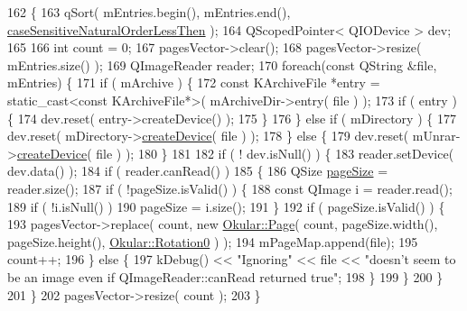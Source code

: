 \begin{DoxyCode}
162 \{
163     qSort( mEntries.begin(), mEntries.end(), \hyperlink{qnatsort_8cpp_a47cfb218123c3ff38d8e674fb78b9f0d}{caseSensitiveNaturalOrderLessThen}
       );
164     QScopedPointer< QIODevice > dev;
165 
166     \textcolor{keywordtype}{int} count = 0;
167     pagesVector->clear();
168     pagesVector->resize( mEntries.size() );
169     QImageReader reader;
170     \textcolor{keywordflow}{foreach}(\textcolor{keyword}{const} QString &file, mEntries) \{
171         \textcolor{keywordflow}{if} ( mArchive ) \{
172             \textcolor{keyword}{const} KArchiveFile *entry = \textcolor{keyword}{static\_cast<}\textcolor{keyword}{const }KArchiveFile*\textcolor{keyword}{>}( mArchiveDir->entry( file ) );
173             \textcolor{keywordflow}{if} ( entry ) \{
174                 dev.reset( entry->createDevice() );
175             \}
176         \} \textcolor{keywordflow}{else} \textcolor{keywordflow}{if} ( mDirectory ) \{
177             dev.reset( mDirectory->\hyperlink{classDirectory_a520a88d8f2acd6179486eab7b8d65ee1}{createDevice}( file ) );
178         \} \textcolor{keywordflow}{else} \{
179             dev.reset( mUnrar->\hyperlink{classUnrar_a455769d0f1aedf1870eafd19e9c1c76a}{createDevice}( file ) );
180         \}
181 
182         \textcolor{keywordflow}{if} ( ! dev.isNull() ) \{
183             reader.setDevice( dev.data() );
184             \textcolor{keywordflow}{if} ( reader.canRead() )
185             \{
186                 QSize \hyperlink{classpageSize}{pageSize} = reader.size();
187                 \textcolor{keywordflow}{if} ( !pageSize.isValid() ) \{
188                     \textcolor{keyword}{const} QImage i = reader.read();
189                     \textcolor{keywordflow}{if} ( !i.isNull() )
190                         pageSize = i.size();
191                 \}
192                 \textcolor{keywordflow}{if} ( pageSize.isValid() ) \{
193                     pagesVector->replace( count, \textcolor{keyword}{new} \hyperlink{classOkular_1_1Page}{Okular::Page}( count, pageSize.width(), 
      pageSize.height(), \hyperlink{namespaceOkular_a8556d00465f61ef533c6b027669e7da6aa4df8fc3dd09e30520c264c8d23d89c2}{Okular::Rotation0} ) );
194                     mPageMap.append(file);
195                     count++;
196                 \} \textcolor{keywordflow}{else} \{
197                     kDebug() << \textcolor{stringliteral}{"Ignoring"} << file << \textcolor{stringliteral}{"doesn't seem to be an image even if
       QImageReader::canRead returned true"};
198                 \}
199             \}
200         \}
201     \}
202     pagesVector->resize( count );
203 \}
\end{DoxyCode}
